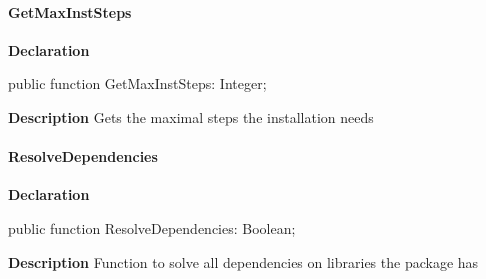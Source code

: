 \documentclass{report}
\newif\ifpdf
\begin{document}
\paragraph*{GetMaxInstSteps}\hspace*{\fill}

\label{ipkhandle.TInstallation-GetMaxInstSteps}
\begin{list}{}{
\setlength{\itemindent}{0cm}
\setlength{\listparindent}{0cm}
\setlength{\leftmargin}{\evensidemargin}
\addtolength{\leftmargin}{\tmplength}
\settowidth{\labelsep}{X}
\addtolength{\leftmargin}{\labelsep}
\setlength{\labelwidth}{\tmplength}
}
\item[\textbf{Declaration}\hfill]
\ifpdf
\begin{flushleft}
\fi
\begin{ttfamily}
public function GetMaxInstSteps: Integer;\end{ttfamily}

\ifpdf
\end{flushleft}
\fi

\par
\item[\textbf{Description}]
Gets the maximal steps the installation needs

\end{list}
\paragraph*{ResolveDependencies}\hspace*{\fill}

\label{ipkhandle.TInstallation-ResolveDependencies}
\begin{list}{}{
\setlength{\itemindent}{0cm}
\setlength{\listparindent}{0cm}
\setlength{\leftmargin}{\evensidemargin}
\addtolength{\leftmargin}{\tmplength}
\settowidth{\labelsep}{X}
\addtolength{\leftmargin}{\labelsep}
\setlength{\labelwidth}{\tmplength}
}
\item[\textbf{Declaration}\hfill]
\ifpdf
\begin{flushleft}
\fi
\begin{ttfamily}
public function ResolveDependencies: Boolean;\end{ttfamily}

\ifpdf
\end{flushleft}
\fi

\par
\item[\textbf{Description}]
Function to solve all dependencies on libraries the package has

\end{list}
\end{document}
